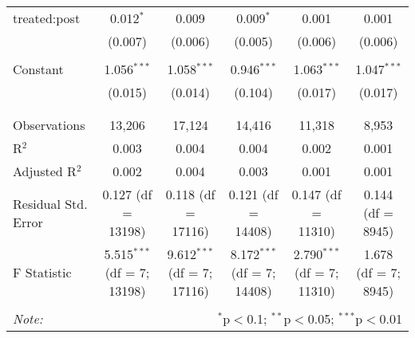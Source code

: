 \begin{table}[!htbp]
\begin{tabular}{@{\extracolsep{5pt}}lccccc}
 treated:post & 0.012$^{*}$ & 0.009 & 0.009$^{*}$ & 0.001 & 0.001 \\ 
  & (0.007) & (0.006) & (0.005) & (0.006) & (0.006) \\ 
  & & & & & \\ 
 Constant & 1.056$^{***}$ & 1.058$^{***}$ & 0.946$^{***}$ & 1.063$^{***}$ & 1.047$^{***}$ \\ 
  & (0.015) & (0.014) & (0.104) & (0.017) & (0.017) \\ 
  & & & & & \\ 
\hline \\[-1.8ex] 
Observations & 13,206 & 17,124 & 14,416 & 11,318 & 8,953 \\ 
R$^{2}$ & 0.003 & 0.004 & 0.004 & 0.002 & 0.001 \\ 
Adjusted R$^{2}$ & 0.002 & 0.004 & 0.003 & 0.001 & 0.001 \\ 
Residual Std. Error & 0.127 (df = 13198) & 0.118 (df = 17116) & 0.121 (df = 14408) & 0.147 (df = 11310) & 0.144 (df = 8945) \\ 
F Statistic & 5.515$^{***}$ (df = 7; 13198) & 9.612$^{***}$ (df = 7; 17116) & 8.172$^{***}$ (df = 7; 14408) & 2.790$^{***}$ (df = 7; 11310) & 1.678 (df = 7; 8945) \\ 
\hline 
\hline \\[-1.8ex] 
\textit{Note:}  & \multicolumn{5}{r}{$^{*}$p$<$0.1; $^{**}$p$<$0.05; $^{***}$p$<$0.01} \\ 
\end{tabular} 
\end{table} 

